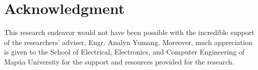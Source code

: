 \documentclass[conference]{IEEEtran}
\begin{document}
\section*{Acknowledgment}
\indent This research endeavor would not have been possible with 
the incredible support of the researchers' adviser, Engr. Analyn Yumang. Moreover, 
much appreciation is given to the School of Electrical, Electronics, and Computer
Engineering of Map\'ua University for the support and resources provided for the
research.



\end{document}
